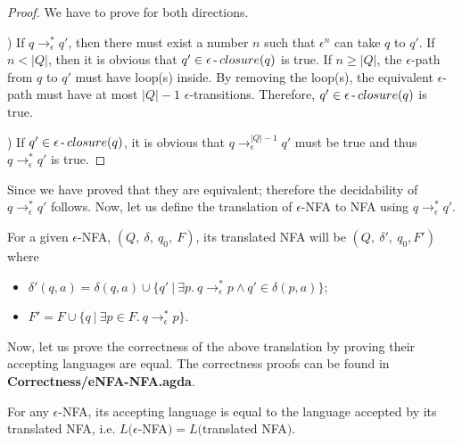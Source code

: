 \begin{proof}
\noindent We have to prove for both directions. 
\par {}) If \(q \to_\epsilon^* q'\), then there must exist a
number \(n\) such that \(\epsilon^n\) can take \(q\) to \(q'\). If
\(n < |Q|\), then it is obvious that \(q' \in
\epsilon\operatorname{-} closure(q)\) is true. If \(n \geq |Q|\), the
\(\epsilon\)-path from \(q\) to \(q'\) must have loop(s) inside. By
removing the loop(s), the equivalent \(\epsilon\)-path must have at
most \(|Q|-1\) \(\epsilon\)-transitions. Therefore, \(q' \in
\epsilon\operatorname{-} closure(q)\) is true. 

\par {}) If \(q' \in \epsilon\operatorname{-} closure(q)\), it is obvious
that \(q \to_\epsilon^{|Q|-1} q'\) must be true and thus \(q
\to_\epsilon^* q'\) is true. 
\end{proof}

\par Since we have proved that they are equivalent; therefore the
decidability of \(q \to_\epsilon^* q'\) follows. Now, let us define
the translation of \(\epsilon\)-NFA to NFA using \(q \to_\epsilon^* q'\). 
 
\begin{defn}
\label{defn:remove_epsilon}
\noindent For a given \(\epsilon\)-NFA, \((Q,\ \delta,\
q_0,\ F)\), its translated NFA will be \((Q,\ \delta',\ q_0,
F')\) where
\begin{itemize}[nolistsep]
  \item \(\delta'(q,a) = \delta (q,a) \cup \{q'\ |\ \exists p.\
      q \to_\epsilon^* p \wedge q' \in \delta (p,a)\}\);
  \item \(F' = F \cup \{q\ |\ \exists p\in F.\ q \to_\epsilon^* p\}
    \). 
\end{itemize}
\end{defn}

\par Now, let us prove the correctness of the above translation by proving their accepting languages
are equal. The correctness proofs can be found in \textbf{Correctness/eNFA-NFA.agda}.

\begin{thm}
\noindent For any \(\epsilon\)-NFA, its accepting language is equal to
the language accepted by its translated NFA, i.e. \(L(\epsilon\)-NFA\()
= L(\)translated NFA\()\). 
\end{thm}

